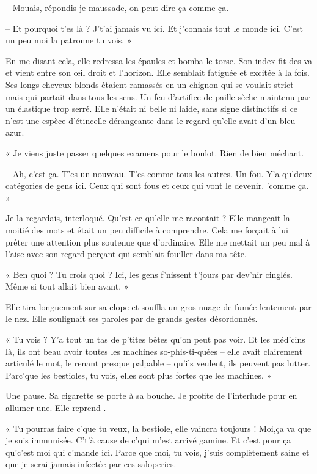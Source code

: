 -- Mouais, répondis-je maussade, on peut dire ça comme ça.

-- Et pourquoi t'es là ? J't'ai jamais vu ici. Et j'connais tout le monde ici. C'est un peu moi la patronne tu vois. »

En me disant cela, elle redressa les épaules et bomba le torse. Son index fit des va et vient entre son œil droit et 
l'horizon. Elle semblait fatiguée et excitée à la fois. Ses longs cheveux blonds étaient ramassés en un chignon qui se 
voulait strict mais qui partait dans tous les sens. Un feu d'artifice de paille sèche maintenu par un élastique trop 
serré. Elle n'était ni belle ni laide, sans signe distinctifs si ce n'est une espèce d'étincelle dérangeante dans le 
regard qu'elle avait d'un bleu azur.

« Je viens juste passer quelques examens pour le boulot. Rien de bien méchant.

-- Ah, c'est ça. T'es un nouveau. T'es comme tous les autres. Un fou. Y'a qu'deux catégories de gens ici. Ceux qui sont 
fous et ceux qui vont le devenir. 'comme ça. »

Je la regardais, interloqué. Qu'est-ce qu'elle me racontait ? Elle mangeait la moitié des mots et était un peu 
difficile à comprendre. Cela me forçait à lui prêter une attention plus soutenue que d'ordinaire. Elle me mettait un 
peu mal à l'aise avec son regard perçant qui semblait fouiller dans ma tête.

« Ben quoi ? Tu crois quoi ? Ici, les gens f'nissent t'jours par dev'nir cinglés. Même si tout allait bien avant. »

Elle tira longuement sur sa clope et souffla un gros nuage de fumée lentement par le nez. Elle soulignait ses paroles 
par de grands gestes désordonnés.

« Tu vois ? Y'a tout un tas de p'tites bêtes qu'on peut pas voir. Et les méd'cins là, ils ont beau avoir toutes les 
machines so-phis-ti-quées -- elle avait clairement articulé le mot, le renant presque palpable -- qu'ils veulent, ils 
peuvent pas lutter. Parc'que les bestioles, tu vois, elles sont plus fortes que les machines. »

Une pause. Sa cigarette se porte à sa bouche. Je profite de l'interlude pour en allumer une. Elle reprend .

« Tu pourras faire c'que tu veux, la bestiole, elle vaincra toujours ! Moi,ça va que je suis immunisée. C't'à cause de 
c'qui m'est arrivé gamine. Et c'est pour ça qu'c'est moi qui c'mande ici. Parce que moi, tu vois, j'suis complètement 
saine et que je serai jamais infectée par ces saloperies.

